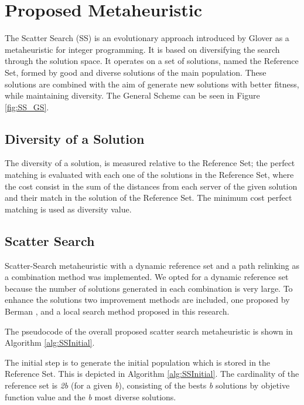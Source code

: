 \section{Proposed Metaheuristic}
The Scatter Search (SS)
is an evolutionary approach
introduced by Glover \cite{glover1977heuristics}
as a metaheuristic for integer programming.
It is based on diversifying the search
through the solution space.
It operates on a set of solutions,
named the Reference Set,
formed by good and diverse solutions of the main population.
These solutions are combined
with the aim of generate
new solutions with better fitness,
while maintaining diversity.
The General Scheme can be seen in Figure \ref{fig:SS_GS}.


\subsection{Diversity of a Solution}
The diversity of a solution,
is measured relative to the Reference Set;
the perfect matching
is evaluated
with each one of the solutions in the Reference Set,
where the cost consist in
the sum of the distances
from each server of the given solution
and their match in the solution of the Reference Set.
The minimum cost perfect matching
is used as diversity value.

\subsection{Scatter Search}
Scatter-Search metaheuristic
with a dynamic reference set
and a path relinking
as a combination method
was implemented.
We opted for a dynamic reference set
because the number of solutions generated
in each combination is very large.
To enhance the solutions
two improvement methods are included,
one proposed by Berman \cite{berman1987stochastic},
and a local search method
proposed in this research.

The pseudocode
of the overall proposed scatter search metaheuristic
is shown in Algorithm \ref{alg:SSInitial}.

The initial step
is to generate the initial population
which is stored in the Reference Set.
This is depicted in Algorithm \ref{alg:SSInitial}.
The cardinality of the reference set is \textit{2b}
(for a given \textit{b}),
consisting of the bests \textit{b} solutions
by objetive function value
and the \textit{b} most diverse solutions.

